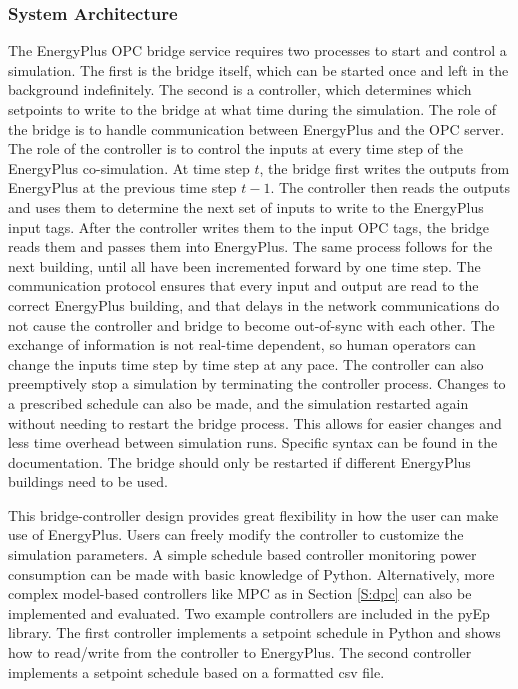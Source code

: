 \subsubsection{System Architecture}

The EnergyPlus OPC bridge service requires two processes to start and control a simulation. 
The first is the bridge itself, which can be started once and left in the background indefinitely. 
The second is a controller, which determines which setpoints to write to the bridge at what time during the simulation. 
The role of the bridge is to handle communication between EnergyPlus and the OPC server. 
The role of the controller is to control the inputs at every time step of the EnergyPlus co-simulation.
At time step $t$, the bridge first writes the outputs from EnergyPlus at the previous time step $t-1$. 
The controller then reads the outputs and uses them to determine the next set of inputs to write to the EnergyPlus input tags. 
After the controller writes them to the input OPC tags, the bridge reads them and passes them into EnergyPlus. 
The same process follows for the next building, until all have been incremented forward by one time step.
The communication protocol ensures that every input and output are read to the correct EnergyPlus building, and that delays in the network communications do not cause the controller and bridge to become out-of-sync with each other. 
The exchange of information is not real-time dependent, so human operators can change the inputs time step by time step at any pace. 
The controller can also preemptively stop a simulation by terminating the controller process. 
Changes to a prescribed schedule can also be made, and the simulation restarted again without needing to restart the bridge process. 
This allows for easier changes and less time overhead between simulation runs.
Specific syntax can be found in the documentation. 
The bridge should only be restarted if different EnergyPlus buildings need to be used.

This bridge-controller design provides great flexibility in how the user can make use of EnergyPlus. 
Users can freely modify the controller to customize the simulation parameters. 
A simple schedule based controller monitoring power consumption can be made with basic knowledge of Python. 
Alternatively, more complex model-based controllers like MPC as in Section \ref{S:dpc} can also be implemented and evaluated.
Two example controllers are included in the pyEp library. 
The first controller implements a setpoint schedule in Python and shows how to read/write from the controller to EnergyPlus. 
The second controller implements a setpoint schedule based on a formatted csv file. 

